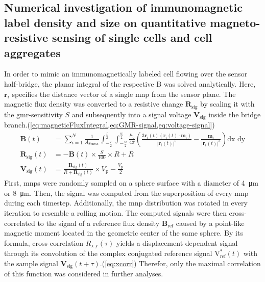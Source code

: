 \subsection{Numerical investigation of immunomagnetic label density and size on quantitative magneto-resistive sensing of single cells and cell aggregates}
In order to mimic an immunomagnetically labeled cell flowing over the sensor half-bridge, the planar integral of the respective \acrfull{B} was solved analytically. Here, $\mathbf{r}_i$ specifies the distance vector of a single \gls{mnp} from the sensor plane. The magnetic flux density was converted to a resistive change $\mathbf{R}_\text{sig}$ by scaling it with the \gls{gmr}-sensitivity $S$ and subsequently into a signal voltage $\mathbf{V}_\text{sig}$ inside the bridge branch.(\cref{eq:magneticFluxIntegral,eq:GMR-signal,eq:voltage-signal})\\
\begin{align}
	\mathbf{B}(t) &= \sum_{i=1}^{N} \frac{1}{A_{\text{Sensor}}} \int_{-\frac{l}{2}}^{\frac{l}{2}} \int_{-\frac{w}{2}}^{\frac{w}{2}} \frac{\mu_{o}}{4 \pi}\left(\frac{3 \mathbf{r}_{i}(t)\left(\mathbf{r}_{i}(t) \cdot \mathbf{m}_{i}\right)}{\left|\mathbf{r}_{i}(t)\right|^{5}}-\frac{\mathbf{m}_{i}}{\left|\mathbf{r}_{i}(t)\right|^{3}}\right) \text{dx dy} \label{eq:magneticFluxIntegral} \\
	\mathbf{R}_\text{sig}(t) &= - \mathbf{B}(t) \times \frac{S}{100} \times R + R \label{eq:GMR-signal}\\
	\mathbf{V}_\text{sig}(t) &= \frac{\mathbf{R}_\text{sig}(t)}{R + \mathbf{R}_\text{sig}(t)}\times V_\text{p} - \frac{V_\text{p}}{2} \label{eq:voltage-signal}
\end{align}
First, \glspl{mnp} were randomly sampled on a sphere surface with a diameter of \SI{4}{\micro\meter} or \SI{8}{\micro\meter}. Then, the signal was computed from the superposition of every \gls{mnp} during each timestep. Additionally, the \gls{mnp} distribution was rotated in every iteration to resemble a rolling motion. The computed signals were then cross-correlated to the signal of a reference flux density $\mathbf{B}_\text{ref}$ caused by a point-like magnetic moment located in the geometric center of the same sphere.
By its formula, cross-correlation $R_\text{x y}(\tau)$ yields a displacement dependent signal through its convolution of the complex conjugated reference signal $\mathrm{V}_\text{ref}^{*}(t)$ with the sample signal $\mathbf{V}_\text{sig}(t+\tau)$.(\cref{eq:xcorr}) Therefor, only the maximal correlation of this function was considered in further analyses.
